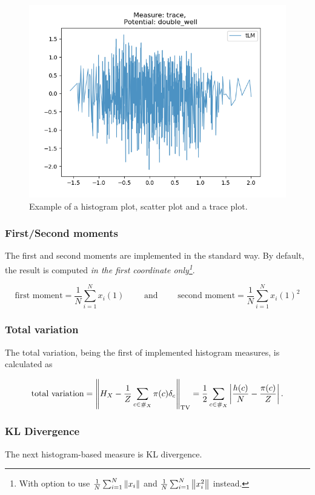 \begin{figure}[H]
\begin{minipage}[b]{0.3\textwidth}
    \includegraphics[width=\textwidth]{Figures/trace_example.png}
  \end{minipage}
   \caption{Example of a histogram plot, scatter plot and a trace plot.}
\end{figure}



\subsubsection{First/Second moments}
The first and second moments are implemented in the standard way. By default, the result is computed \textit{in the first coordinate only\footnote{With option to use $\frac 1 N\sum_{i=1}^N \norm{x_i}$ and $\frac 1 N\sum_{i=1}^N \norm{x_i^2}$ instead.}}.

$$ 
    \text{first moment} = \frac 1 N\sum_{i=1}^N x_i(1) \qquad \text{ and } \qquad \text{second moment} = \frac 1 N\sum_{i=1}^N x_i(1)^2
$$


\subsubsection{Total variation}
The total variation, being the first of implemented histogram measures, is calculated as

\[\text{total variation} = \norm{H_X - \frac 1 Z \sum_{c \in \#_X} \pi(c) \delta_c}_{\text{TV}} = \frac 1 2\sum_{c \in \#_X} \left|\frac{h(c)}{N} - \frac{\pi(c)}{Z}\right| .\]

\subsubsection{KL Divergence}
The next histogram-based measure is KL divergence.

